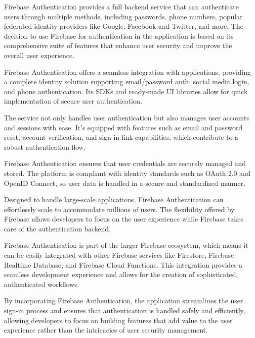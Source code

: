 Firebase Authentication provides a full backend service that can authenticate users through multiple methods, including passwords, phone numbers, popular federated identity providers like Google, Facebook and Twitter, and more. The decision to use Firebase for authentication in the application is based on its comprehensive suite of features that enhance user security and improve the overall user experience.

Firebase Authentication offers a seamless integration with applications, providing a complete identity solution supporting email/password auth, social media login, and phone authentication. Its SDKs and ready-made UI libraries allow for quick implementation of secure user authentication.

The service not only handles user authentication but also manages user accounts and sessions with ease. It's equipped with features such as email and password reset, account verification, and sign-in link capabilities, which contribute to a robust authentication flow.

Firebase Authentication ensures that user credentials are securely managed and stored. The platform is compliant with identity standards such as OAuth 2.0 and OpenID Connect, so user data is handled in a secure and standardized manner. 

Designed to handle large-scale applications, Firebase Authentication can effortlessly scale to accommodate millions of users. The flexibility offered by Firebase allows developers to focus on the user experience while Firebase takes care of the authentication backend.

Firebase Authentication is part of the larger Firebase ecosystem, which means it can be easily integrated with other Firebase services like Firestore, Firebase Realtime Database, and Firebase Cloud Functions. This integration provides a seamless development experience and allows for the creation of sophisticated, authenticated workflows.

By incorporating Firebase Authentication, the application streamlines the user sign-in process and ensures that authentication is handled safely and efficiently, allowing developers to focus on building features that add value to the user experience rather than the intricacies of user security management.
